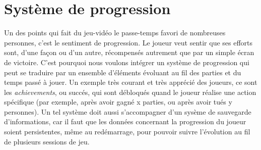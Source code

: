 \documentclass[../doc.tex ]{subfiles}
\begin{document}
\section{Système de progression}
Un des points qui fait du jeu-vidéo le passe-temps
favori de nombreuses personnes, c'est le sentiment de
progression. Le joueur veut sentir que ses efforts sont,
d'une façon ou d'un autre, récompensés autrement que par un
simple écran de victoire. C'est pourquoi nous voulons intégrer
un système de progression qui peut se traduire par un ensemble
d'éléments évoluant au fil des parties et du temps passé à jouer.
\newline\indent
Un exemple très courant et très apprécié des joueurs, ce sont les
\textit{achievements}, ou succés, qui sont débloqués quand le joueur réalise
une action spécifique (par exemple, après avoir gagné x parties,
ou après avoir tués y personnes). Un tel système doit aussi s'accompagner d'un sysème de sauvegarde d'informations,
car il faut que les données concernant la progression du joueur
soient persistentes, même au redémarrage, pour pouvoir suivre l'évolution au fil de plusieurs sessions de jeu.
\end{document}
